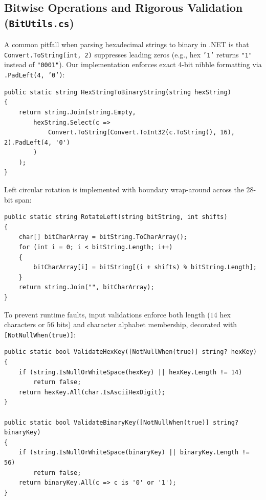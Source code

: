 \documentclass[12pt,a4paper]{article}
\begin{document}
\subsection{Bitwise Operations and Rigorous Validation (\texttt{BitUtils.cs})}
A common pitfall when parsing hexadecimal strings to binary in .NET is that \texttt{Convert.ToString(int, 2)} suppresses leading zeros (e.g., hex \texttt{'1'} returns \texttt{"1"} instead of \texttt{"0001"}). Our implementation enforces exact 4-bit nibble formatting via \texttt{.PadLeft(4, '0')}:

\begin{lstlisting}
public static string HexStringToBinaryString(string hexString)
{
    return string.Join(string.Empty,
        hexString.Select(c => 
            Convert.ToString(Convert.ToInt32(c.ToString(), 16), 2).PadLeft(4, '0')
        )
    );
}
\end{lstlisting}

Left circular rotation is implemented with boundary wrap-around across the 28-bit span:
\begin{lstlisting}
public static string RotateLeft(string bitString, int shifts)
{
    char[] bitCharArray = bitString.ToCharArray();
    for (int i = 0; i < bitString.Length; i++)
    {
        bitCharArray[i] = bitString[(i + shifts) % bitString.Length];
    }
    return string.Join("", bitCharArray);
}
\end{lstlisting}

To prevent runtime faults, input validations enforce both length ($14$ hex characters or $56$ bits) and character alphabet membership, decorated with \texttt{[NotNullWhen(true)]}:
\begin{lstlisting}
public static bool ValidateHexKey([NotNullWhen(true)] string? hexKey)
{
    if (string.IsNullOrWhiteSpace(hexKey) || hexKey.Length != 14)
        return false;
    return hexKey.All(char.IsAsciiHexDigit);
}

public static bool ValidateBinaryKey([NotNullWhen(true)] string? binaryKey)
{
    if (string.IsNullOrWhiteSpace(binaryKey) || binaryKey.Length != 56)
        return false;
    return binaryKey.All(c => c is '0' or '1');
}
\end{lstlisting}
\end{document}
